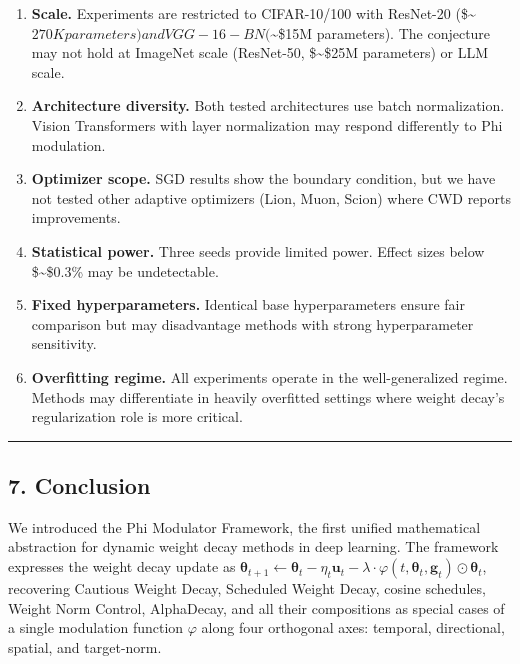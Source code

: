 \documentclass[
]{article}
\begin{document}
\begin{enumerate}
\def\labelenumi{\arabic{enumi}.}
\item
  \textbf{Scale.} Experiments are restricted to CIFAR-10/100 with
  ResNet-20 (\$\sim\(270K parameters) and VGG-16-BN (\)\sim\$15M
  parameters). The conjecture may not hold at ImageNet scale (ResNet-50,
  \$\sim\$25M parameters) or LLM scale.
\item
  \textbf{Architecture diversity.} Both tested architectures use batch
  normalization. Vision Transformers with layer normalization may
  respond differently to Phi modulation.
\item
  \textbf{Optimizer scope.} SGD results show the boundary condition, but
  we have not tested other adaptive optimizers (Lion, Muon, Scion) where
  CWD reports improvements.
\item
  \textbf{Statistical power.} Three seeds provide limited power. Effect
  sizes below \$\sim\$0.3\% may be undetectable.
\item
  \textbf{Fixed hyperparameters.} Identical base hyperparameters ensure
  fair comparison but may disadvantage methods with strong
  hyperparameter sensitivity.
\item
  \textbf{Overfitting regime.} All experiments operate in the
  well-generalized regime. Methods may differentiate in heavily
  overfitted settings where weight decay's regularization role is more
  critical.
\end{enumerate}

\begin{center}\rule{0.5\linewidth}{0.5pt}\end{center}

\hypertarget{conclusion}{%
\subsection{7. Conclusion}\label{conclusion}}

We introduced the Phi Modulator Framework, the first unified
mathematical abstraction for dynamic weight decay methods in deep
learning. The framework expresses the weight decay update as
\(\boldsymbol{\theta}_{t+1} \leftarrow \boldsymbol{\theta}_t - \eta_t \mathbf{u}_t - \lambda \cdot \varphi(t, \boldsymbol{\theta}_t, \mathbf{g}_t) \odot \boldsymbol{\theta}_t\),
recovering Cautious Weight Decay, Scheduled Weight Decay, cosine
schedules, Weight Norm Control, AlphaDecay, and all their compositions
as special cases of a single modulation function \(\varphi\) along four
orthogonal axes: temporal, directional, spatial, and target-norm.
\end{document}
